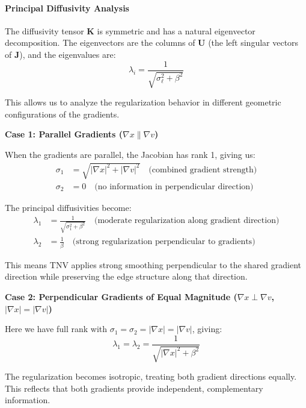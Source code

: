 \paragraph{Principal Diffusivity Analysis}

The diffusivity tensor $\mathbf{K}$ is symmetric and has a natural eigenvector decomposition. The eigenvectors are the columns of $\mathbf{U}$ (the left singular vectors of $\mathbf{J}$), and the eigenvalues are:
\begin{equation}
\lambda_i = \frac{1}{\sqrt{\sigma_\ell^2 + \beta^2}}
\end{equation}

This allows us to analyze the regularization behavior in different geometric configurations of the gradients.

\textbf{Case 1: Parallel Gradients ($\nabla x \parallel \nabla v$)}

When the gradients are parallel, the Jacobian has rank 1, giving us:
\begin{align}
\sigma_1 &= \sqrt{|\nabla x|^2 + |\nabla v|^2} \quad \text{(combined gradient strength)} \\
\sigma_2 &= 0 \quad \text{(no information in perpendicular direction)}
\end{align}

The principal diffusivities become:
\begin{align}
\lambda_1 &= \frac{1}{\sqrt{\sigma_1^2 + \beta^2}} \quad \text{(moderate regularization along gradient direction)} \\
\lambda_2 &= \frac{1}{\beta} \quad \text{(strong regularization perpendicular to gradients)}
\end{align}

This means TNV applies strong smoothing perpendicular to the shared gradient direction while preserving the edge structure along that direction.

\textbf{Case 2: Perpendicular Gradients of Equal Magnitude ($\nabla x \perp \nabla v$, $|\nabla x| = |\nabla v|$)}

Here we have full rank with $\sigma_1 = \sigma_2 = |\nabla x| = |\nabla v|$, giving:
\begin{equation}
\lambda_1 = \lambda_2 = \frac{1}{\sqrt{|\nabla x|^2 + \beta^2}}
\end{equation}

The regularization becomes isotropic, treating both gradient directions equally. This reflects that both gradients provide independent, complementary information.

